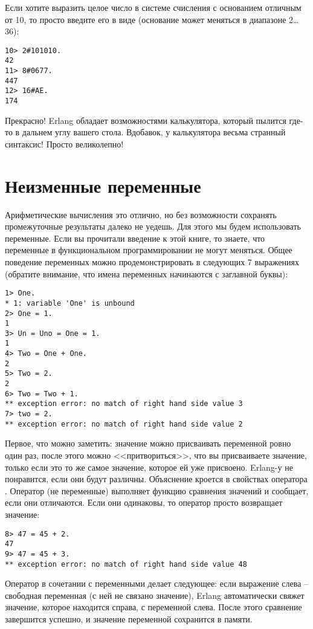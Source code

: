 Если хотите выразить целое число в системе счисления с основанием отличным от 10, то просто введите его в виде  (основание может меняться в диапазоне 2\ldots36):
\begin{lstlisting}[style=repl]
10> 2#101010.
42
11> 8#0677.
447
12> 16#AE.
174
\end{lstlisting}

Прекрасно!
Erlang обладает возможностями калькулятора, который пылится где\--то в дальнем углу вашего стола.
Вдобавок, у калькулятора весьма странный синтаксис!
Просто великолепно!
\section{Неизменные переменные}\label{invariable-variables}
Арифметические вычисления это отлично, но без возможности сохранять промежуточные результаты далеко не уедешь.
Для этого мы будем использовать переменные.
Если вы прочитали введение к этой книге, то знаете, что переменные в функциональном программировании не могут меняться.
Общее поведение переменных можно продемонстрировать в следующих 7 выражениях (обратите внимание, что имена переменных начинаются с заглавной буквы):
\begin{lstlisting}[style=repl]
1> One.
* 1: variable 'One' is unbound
2> One = 1.
1
3> Un = Uno = One = 1.
1
4> Two = One + One.
2
5> Two = 2.
2
6> Two = Two + 1.
** exception error: no match of right hand side value 3
7> two = 2.
** exception error: no match of right hand side value 2
\end{lstlisting}

Первое, что можно заметить: значение можно присваивать переменной ровно один раз, после этого можно <<притвориться>>, что вы присваиваете значение, только если это то же самое значение, которое ей уже присвоено.
Erlang\--у не понравится, если они будут различны.
Объяснение кроется в свойствах оператора \ops{\strut=}.
Оператор \ops{\strut=} (не переменные) выполняет функцию сравнения значений и сообщает, если они отличаются.
Если они одинаковы, то оператор просто возвращает значение:
\begin{lstlisting}[style=repl]
8> 47 = 45 + 2.
47
9> 47 = 45 + 3.
** exception error: no match of right hand side value 48
\end{lstlisting}

Оператор в сочетании с переменными делает следующее: если выражение слева \--- свободная переменная (с ней не связано значение), Erlang автоматически свяжет значение, которое находится справа, с переменной слева.
После этого сравнение завершится успешно, и значение переменной сохранится в памяти.

